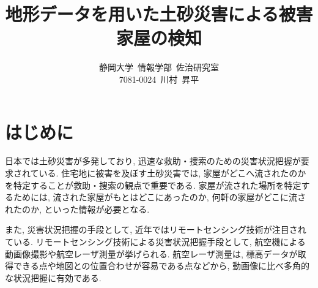 \documentclass[a4paper, twocolumn, xelatex, 10pt, ja=standard, Ligatures=TeX]{bxjsarticle}
\title{\bf 地形データを用いた土砂災害による被害家屋の検知}
\author{静岡大学\ 情報学部\ 佐治研究室 \\ 7081-0024\ 川村\ 昇平}
\date{}
\begin{document}
	
	\maketitle

	\section{はじめに}




		日本では土砂災害が多発しており, 迅速な救助・捜索のための災害状況把握が要求されている. 
		住宅地に被害を及ぼす土砂災害では, 家屋がどこへ流されたのかを特定することが救助・捜索の観点で重要である. 
		家屋が流された場所を特定するためには, 流された家屋がもとはどこにあったのか, 何軒の家屋がどこに流されたのか, といった情報が必要となる. 

		また, 災害状況把握の手段として, 近年ではリモートセンシング技術が注目されている. 
		リモートセンシング技術による災害状況把握手段として, 航空機による動画像撮影や航空レーザ測量が挙げられる. 
		航空レーザ測量は, 標高データが取得できる点や地図との位置合わせが容易である点などから, 動画像に比べ多角的な状況把握に有効である. 
\end{document}
